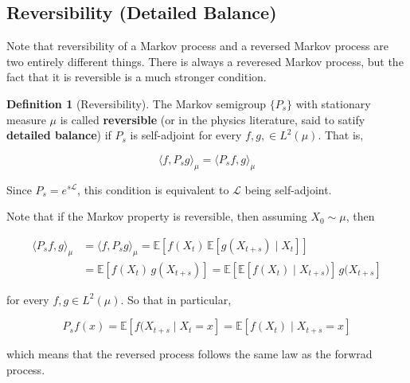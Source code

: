 \documentclass{article}
\theoremstyle{definition}
\theoremstyle{remark}
\theoremstyle{definition}
\newtheorem{definition}{Definition}[section]
\begin{document}
  \subsection{Reversibility (Detailed Balance)}

    Note that reversibility of a Markov process and a reversed Markov process are two entirely different things. There is always a reveresed Markov process, but the fact that it is reversible is a much stronger condition. 

    \begin{definition}[Reversibility]
      The Markov semigroup $\{P_s\}$ with stationary measure $\mu$ is called \textbf{reversible} (or in the physics literature, said to satify \textbf{detailed balance}) if $P_s$ is self-adjoint for every $f, g, \in L^2 (\mu)$. That is, 

        \[\langle f, P_s g \rangle_\mu = \langle P_s f, g \rangle_\mu\]

      Since $P_s = e^{s \mathscr{L}}$, this condition is equivalent to $\mathscr{L}$ being self-adjoint.
    \end{definition}

    Note that if the Markov property is reversible, then assuming $X_0 \sim \mu$, then 

    \begin{align*}
      \langle P_s f, g \rangle_\mu & = \langle f, P_s g \rangle_\mu = \mathbb{E}[ f(X_t) \, \mathbb{E}[g(X_{t + s}) \mid X_t]] \\
      & = \mathbb{E}[ f(X_t) \, g(X_{t + s})] = \mathbb{E}[ \mathbb{E}[ f(X_t) \mid X_{t + s})] \, g(X_{t + s}] 
    \end{align*}

    for every $f, g \in L^2 (\mu)$. So that in particular, 

      \[P_s f (x) = \mathbb{E}[f(X_{t + s} \mid X_t = x] = \mathbb{E}[f(X_t) \mid X_{t + s} = x]\]

    which means that the reversed process follows the same law as the forwrad process. 
\end{document}
